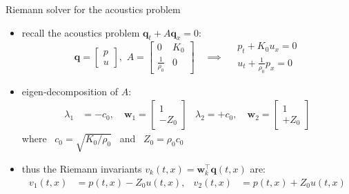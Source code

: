 \documentclass[10pt,dvipsnames,usepdftitle=false,
hyperref={pdftitle = {Finite volume methods},
    pdfauthor = {Ed Bueler}}]{beamer}
\newcommand{\bq}{\mathbf{q}}
\newcommand{\bw}{\mathbf{w}}
\begin{document}
\begin{frame}{Riemann solver for the acoustics problem}

\begin{itemize}
\item recall the acoustics problem $\bq_t + A \bq_x = 0$:
        $$\bq = \begin{bmatrix} p \\ u \end{bmatrix}, \,\, A = \begin{bmatrix} 0 & K_0 \\ \frac{1}{\rho_0} & 0 \end{bmatrix} \quad \implies \quad \begin{matrix} p_t + K_0 u_x = 0 \\ u_t + \frac{1}{\rho_0} p_x = 0 \end{matrix}$$
\item eigen-decomposition of $A$:
\begin{align*}
\lambda_1 &= -c_0, \quad \bw_1 = \begin{bmatrix} 1 \\ -Z_0 \end{bmatrix} & \lambda_2 = +c_0, \quad \bw_2 = \begin{bmatrix} 1 \\ +Z_0 \end{bmatrix}
\end{align*}
where \, $c_0 = \sqrt{K_0/\rho_0}$ \, and \, $Z_0=\rho_0 c_0$
\item thus the Riemann invariants $v_k(t,x) = \bw_k^\top \bq(t,x)$ are:
\begin{align*}
v_1(t,x) &= p(t,x) - Z_0 u(t,x), & v_2(t,x) &= p(t,x) + Z_0 u(t,x)
\end{align*}
\end{itemize}
\end{frame}
\end{document}
